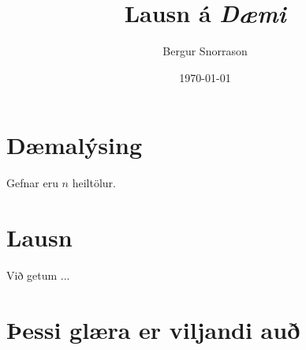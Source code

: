 \title{Lausn á \emph{Dæmi}}
\author{Bergur Snorrason}
\date{\today}



\frame{\titlepage}

\section{Dæmalýsing}
{
	{
		\item<1-> Gefnar eru $n$ heiltölur.
	}
}

\section{Lausn}
{
	{
		\item<1-> Við getum ...
	}
}

\section{Þessi glæra er viljandi auð}
{
}


